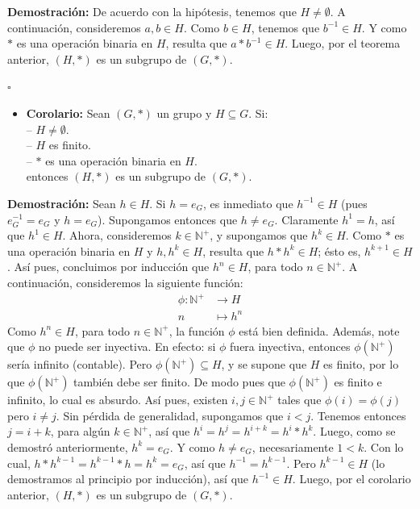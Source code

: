 \documentclass[10 pt]{article}
\begin{document}
\Large{\textbf{Demostración:} De acuerdo con la hipótesis, tenemos que $H \neq \emptyset$. A continuación, consideremos $a,b \in H$. Como $b \in H$, tenemos que $b^{-1} \in H$. Y como $*$ es una operación binaria en $H$, resulta que $a*b^{-1} \in H$. Luego, por el teorema anterior, $(H,*)$ es un subgrupo de $(G,*)$.} \\

\begin{flushright}
    $\square$
\end{flushright}

\begin{itemize}
    \item \Large{\textbf{Corolario:} Sean $(G,*)$ un grupo y $H \subseteq G$. Si: \\

    -- $H \neq \emptyset$. \\

    -- $H$ es finito. \\

    -- $*$ es una operación binaria en $H$. \\

    entonces $(H,*)$ es un subgrupo de $(G,*)$.} \\
\end{itemize}

\Large{\textbf{Demostración:} Sean $h \in H$. Si $h=e_G$, es inmediato que $h^{-1} \in H$ (pues $e_G^{-1}=e_G$ y $h=e_G$). Supongamos entonces que $h \neq e_G$. Claramente $h^{1}=h$, así que $h^1 \in H$. Ahora, consideremos $k \in \mathbb N^+$, y supongamos que $h^k \in H$. Como $*$ es una operación binaria en $H$ y $h,h^k \in H$, resulta que $h*h^{k} \in H$; ésto es, $h^{k+1} \in H$. Así pues, concluimos por inducción que $h^{n} \in H$, para todo $n \in \mathbb N^+$.  A continuación, consideremos la siguiente función:}
\begin{align*}
    \phi: \mathbb N^+ &\rightarrow H \\
    n&\mapsto h^n
\end{align*}
\Large{Como $h^n \in H$, para todo $n \in \mathbb N^+$, la función $\phi$ está bien definida. Además, note que $\phi$ no puede ser inyectiva. En efecto: si $\phi$ fuera inyectiva, entonces $\phi(\mathbb N^+)$ sería infinito (contable). Pero $\phi(\mathbb N^+) \subseteq H$, y se supone que $H$ es finito, por lo que $\phi(\mathbb N^+)$ también debe ser finito. De modo pues que $\phi(\mathbb N^+)$ es finito e infinito, lo cual es absurdo. Así pues, existen $i,j \in \mathbb N^+$ tales que $\phi(i)=\phi(j)$ pero $i \neq j$. Sin pérdida de generalidad, supongamos que $i<j$. Tenemos entonces $j=i+k$, para algún $k \in \mathbb N^+$, así que $h^i=h^{j}=h^{i+k}=h^{i}*h^{k}$. Luego, como se demostró anteriormente, $h^k=e_G$. Y como $h \neq e_G$, necesariamente $1<k$. Con lo cual, $h*h^{k-1}=h^{k-1}*h=h^{k}=e_G$, así que $h^{-1}=h^{k-1}$. Pero $h^{k-1} \in H$ (lo demostramos al principio por inducción), así que $h^{-1} \in H$. Luego, por el corolario anterior, $(H,*)$ es un subgrupo de $(G,*)$.} \\
\end{document}
